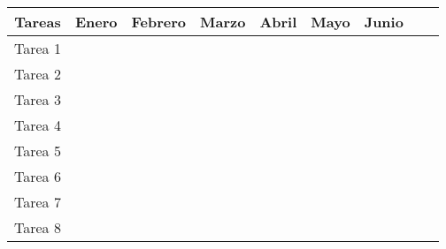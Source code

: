 \documentclass[12pt,letterpaper]{article}
\author{Cindy Mariella Castellón Salguero}
\begin{document}
\begin{center}
\begingroup
\setlength{\tabcolsep}{10pt} %
\renewcommand{\arraystretch}{1.2} %
\begin{tabular}{|c|c|c|c|c|c|c|c|c|}
\hline
\textbf{Tareas} & \textbf{Enero} & \textbf{Febrero} & \textbf{Marzo} & \textbf{Abril} & \textbf{Mayo} & \textbf{Junio} \\ \hline
Tarea 1 & \cellcolor[gray]{0.5} &  &  &  &  &	\\ \hline
Tarea 2 & \cellcolor[gray]{0.5} & & & & &	\\ \hline
Tarea 3 & & \cellcolor[gray]{0.5} & & & &	\\ \hline
Tarea 4 & & \cellcolor[gray]{0.5} & & & &	\\ \hline
Tarea 5 & & & \cellcolor[gray]{0.5} & & &	\\ \hline
Tarea 6 & & & \cellcolor[gray]{0.5} & & &	\\ \hline
Tarea 7 & & & \cellcolor[gray]{0.5} & \cellcolor[gray]{0.5} & \cellcolor[gray]{0.5} &	\\ \hline
Tarea 8 & & & & & & \cellcolor[gray]{0.5}	\\ \hline
\end{tabular}
\endgroup
\end{center}
\end{document}
